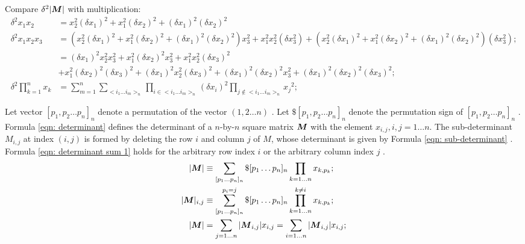 \documentclass[twoside]{article}
\numberwithin{equation}{section}
\begin{document}
Compare $\delta^2 |\protect{\textrm{\boldmath $M$}}|$ with multiplication:
\begin{align*}
\delta^2 x_1 x_2 &= x_2^2 (\delta x_1)^2 + x_1^2 (\delta x_2)^2 + (\delta x_1)^2 (\delta x_2)^2 \\
\delta^2 x_1 x_2 x_3 &= \left( x_2^2 (\delta x_1)^2 + x_1^2 (\delta x_2)^2 + (\delta x_1)^2 (\delta x_2)^2 \right) x_3^2 + x_1^2 x_2^2 (\delta x_3^2) 
		+ \left( x_2^2 (\delta x_1)^2 + x_1^2 (\delta x_2)^2 + (\delta x_1)^2 (\delta x_2)^2 \right) (\delta x_3^2); \\
	&= (\delta x_1)^2 x_2^2 x_3^2 + x_1^2 (\delta x_2)^2 x_3^2 + x_1^2 x_2^2 (\delta x_3)^2 \\
	&+  x_1^2 (\delta x_2)^2 (\delta x_3)^2 + (\delta x_1)^2 x_2^2 (\delta x_3)^2 + (\delta x_1)^2 (\delta x_2)^2 x_3^2 + (\delta x_1)^2 (\delta x_2)^2 (\delta x_3)^2; \\
\delta^2 \prod_{k=1}^{n} x_k &= \sum_{m=1}^{n} \sum_{<i_1 \dots i_m>_n} \prod_{i \in <i_1 \dots i_m>_n} (\delta x_i)^2 \prod_{j \not \in <i_1 \dots i_m>_n} {x_j}^2;
\end{align*}

\fi

Let vector $[p_1, p_{2} \dots p_n]_n$ denote a permutation of the vector $(1,2\dots n)$ \cite{Linear_Algebra}.  
Let $\$[p_1, p_{2} \dots p_n]_n$ denote the permutation sign of $[p_1, p_{2} \dots p_n]_n$ \cite{Linear_Algebra}. 
Formula \eqref{eqn: determinant} \cite{Linear_Algebra} defines the determinant of a $n$-by-$n$ square matrix $\protect{\textrm{\boldmath $M$}}$ with the element $x_{i,j}, i,j=1 \dots n$.
The sub-determinant \cite{Linear_Algebra} $M_{i,j}$ at index $(i, j)$ is formed by deleting the row $i$ and column $j$ of $M$, whose determinant is given by 
Formula \eqref{eqn: sub-determinant} \cite{Linear_Algebra}.
Formula \eqref{eqn: determinant sum 1} holds for the arbitrary row index $i$ or the arbitrary column index $j$ \cite{Linear_Algebra}.
\begin{align}
\label{eqn: determinant}
|\protect{\textrm{\boldmath $M$}}| &\equiv \sum_{[p_1\dots p_n]_n} \$ [p_1\dots p_n]_n \prod_{k=1 \dots n} x_{k,p_{k}}; \\
\label{eqn: sub-determinant}
|\protect{\textrm{\boldmath $M$}}|_{i,j} &\equiv \sum_{[p_1\dots p_n]_n}^{p_{i} = j} \$ [p_1\dots p_n]_n \prod_{k=1 \dots n}^{k \ne i} x_{k,p_{k}}; \\
\label{eqn: determinant sum 1}
|\protect{\textrm{\boldmath $M$}}| &=\sum_{j=1 \dots n} |\protect{\textrm{\boldmath $M$}}_{i,j}| x_{i,j} = \sum_{i=1 \dots n} |\protect{\textrm{\boldmath $M$}}_{i,j}| x_{i,j};
\end{align}
\end{document}
